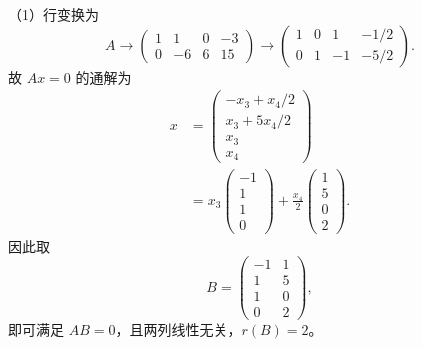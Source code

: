 \documentclass[11pt,fontset=fandol]{ctexart}
\begin{document}
（1）行变换为 \[
A\longrightarrow\begin{pmatrix}1&1&0&-3\\0&-6&6&15\end{pmatrix}
\longrightarrow\begin{pmatrix}1&0&1&-1/2\\0&1&-1&-5/2\end{pmatrix}.
\] 故 \(Ax=0\) 的通解为 \[
\begin{aligned}
x&=\begin{pmatrix}-x_3+x_4/2\\x_3+5x_4/2\\x_3\\x_4\end{pmatrix}\\
&=x_3\begin{pmatrix}-1\\1\\1\\0\end{pmatrix}
+\frac{x_4}{2}\begin{pmatrix}1\\5\\0\\2\end{pmatrix}.
\end{aligned}
\] 因此取 \[
B=\begin{pmatrix}-1&1\\1&5\\1&0\\0&2\end{pmatrix},
\] 即可满足 \(AB=0\)，且两列线性无关，\(r(B)=2\)。
\end{document}
